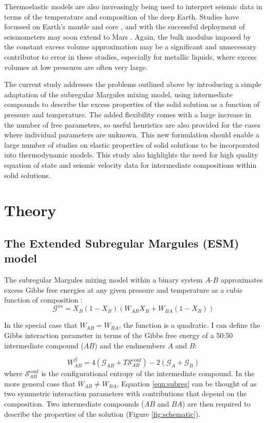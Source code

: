 \documentclass[review]{elsarticle}
\begin{document}
Thermoelastic models are also increasingly being used to interpret seismic data in terms of the temperature and composition of the deep Earth. Studies have focussed on Earth's mantle \citep[e.g.][]{DGDSBR2012, MCDRT2012, DCT2012} and core \citep[e.g.][]{SGGFMM2000,SFGMM2004}, and with the successful deployment of seismometers may soon extend to Mars \citep{GLZR2014}. Again, the bulk modulus imposed by the constant excess volume approximation may be a significant and unnecessary contributor to error in these studies, especially for metallic liquids, where excess volumes at low pressures are often very large. 

The current study addresses the problems outlined above by introducing a simple adaptation of the subregular Margules mixing model, using intermediate compounds to describe the excess properties of the solid solution as a function of pressure and temperature. The added flexibility comes with a large increase in the number of free parameters, so useful heuristics are also provided for the cases where individual parameters are unknown. This new formulation should enable a large number of studies on elastic properties of solid solutions to be incorporated into thermodynamic models. This study also highlights the need for high quality equation of state and seismic velocity data for intermediate compositions within solid solutions.

\section{Theory} 
\subsection{The Extended Subregular Margules (ESM) model}
The subregular Margules mixing model within a binary system $A$-$B$ approximates excess Gibbs free energies at any given pressure and temperature as a cubic function of composition \citep{HW1989}:
\begin{equation}
  \mathcal{G}^{xs} = X_B (1-X_B) \left(W_{AB} X_B + W_{BA} (1-X_B) \right)
  \label{eqn:subreg}
\end{equation}

In the special case that $W_{AB} = W_{BA}$, the function is a quadratic. I can define the Gibbs interaction parameter in terms of the Gibbs free energy of a 50:50 intermediate compound ($AB$) and the endmembers $A$ and $B$:

\begin{equation}
  W^{\mathcal{G}}_{AB} = 4(\mathcal{G}_{AB} + T\mathcal{S}^{\textrm{conf}}_{AB}) - 2(\mathcal{G}_A + \mathcal{G}_B)
\end{equation}
\noindent where $\mathcal{S}^{\textrm{conf}}_{AB}$ is the configurational entropy of the intermediate compound. In the more general case that $W_{AB} \neq W_{BA}$, Equation \ref{eqn:subreg} can be thought of as two symmetric interaction parameters with contributions that depend on the composition. Two intermediate compounds ($AB$ and $BA$) are then required to describe the properties of the solution (Figure \ref{fig:schematic}).
\end{document}
